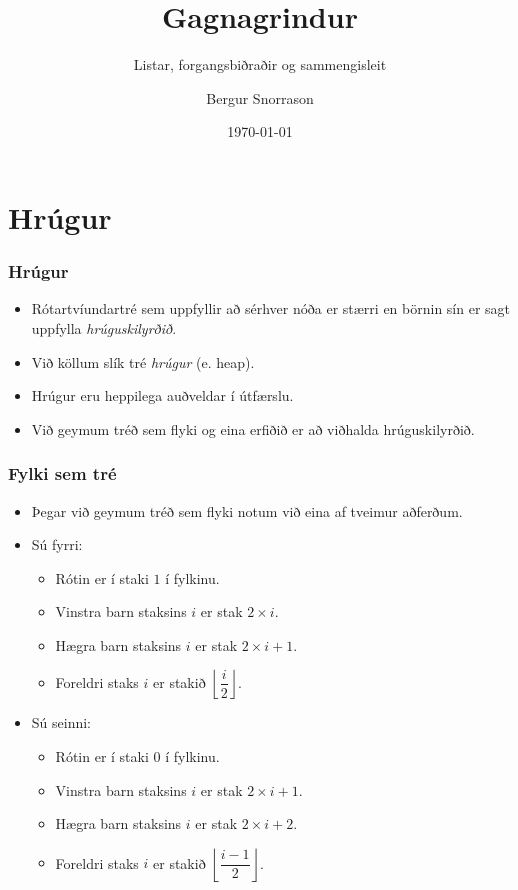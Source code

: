 \documentclass{beamer}
\title{Gagnagrindur}
\subtitle{Listar, forgangsbiðraðir og sammengisleit}
\author{Bergur Snorrason}
\date{\today}
\begin{document}
\frame{\titlepage}

\section[Hrúgur]{Hrúgur}

\begin{frame}
\frametitle{Hrúgur}
\begin{itemize}
	\item<1-> Rótartvíundartré sem uppfyllir að sérhver nóða er stærri en börnin sín er sagt uppfylla \emph{hrúguskilyrðið}.
	\item<2-> Við köllum slík tré \emph{hrúgur} (e. heap).
	\item<3-> Hrúgur eru heppilega auðveldar í útfærslu.
	\item<4-> Við geymum tréð sem flyki og eina erfiðið er að viðhalda hrúguskilyrðið.
\end{itemize}
\end{frame}

\begin{frame}
\frametitle{Fylki sem tré}
\begin{itemize}
\item<1-> Þegar við geymum tréð sem flyki notum við eina af tveimur aðferðum.
\item<2-> Sú fyrri:
	\begin{itemize}
		\item<3-> Rótin er í staki $1$ í fylkinu.
		\item<4-> Vinstra barn staksins $i$ er stak $2\times i$.
		\item<5-> Hægra barn staksins $i$ er stak $2\times i + 1$.
		\item<6-> Foreldri staks $i$ er stakið $\left \lfloor \dfrac{i}{2} \right \rfloor$.
	\end{itemize}
\item<7-> Sú seinni:
	\begin{itemize}
		\item<8-> Rótin er í staki $0$ í fylkinu.
		\item<9-> Vinstra barn staksins $i$ er stak $2\times i + 1$.
		\item<10-> Hægra barn staksins $i$ er stak $2\times i + 2$.
		\item<11-> Foreldri staks $i$ er stakið $\left \lfloor \dfrac{i - 1}{2} \right \rfloor$.
	\end{itemize}
\end{itemize}
\end{frame}
\end{document}
